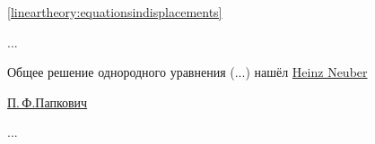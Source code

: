 
 \eqref{lineartheory:equationsindisplacements} 

...

\begin{otherlanguage}{russian}

Общее решение однородного уравнения (...) нашёл \href{https://de.wikipedia.org/wiki/Heinz_Neuber}{Heinz Neuber}

\href{https://ru.wikipedia.org/wiki/%D0%9F%D0%B0%D0%BF%D0%BA%D0%BE%D0%B2%D0%B8%D1%87,_%D0%9F%D1%91%D1%82%D1%80_%D0%A4%D1%91%D0%B4%D0%BE%D1%80%D0%BE%D0%B2%D0%B8%D1%87}{П.\,Ф.\:Папкович}

\end{otherlanguage}

...
